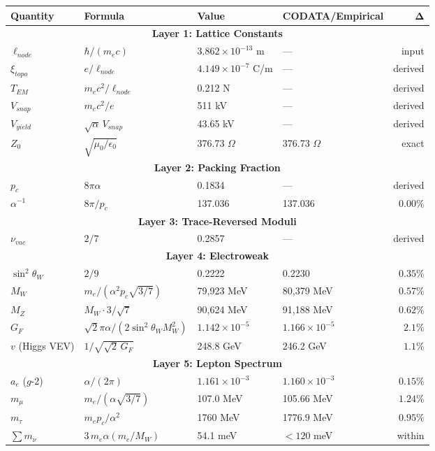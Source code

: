 \begin{center}
\small
\renewcommand{\arraystretch}{1.3}
\begin{tabular}{@{}llllr@{}}
\toprule
\textbf{Quantity} & \textbf{Formula} & \textbf{Value}
& \textbf{CODATA/Empirical} & $\boldsymbol{\Delta}$ \\
\midrule
\multicolumn{5}{c}{\cellcolor[HTML]{EFEFEF}\textbf{Layer 1: Lattice Constants}}\\
$\ell_{node}$ & $\hbar/(m_e c)$ & $3.862\!\times\!10^{-13}$ m & --- & input \\
$\xi_{topo}$  & $e/\ell_{node}$ & $4.149\!\times\!10^{-7}$ C/m & --- & derived \\
$T_{EM}$      & $m_e c^2/\ell_{node}$ & 0.212 N & --- & derived \\
$V_{snap}$    & $m_e c^2/e$ & 511 kV & --- & derived \\
$V_{yield}$   & $\sqrt{\alpha}\,V_{snap}$ & 43.65 kV & --- & derived \\
$Z_0$         & $\sqrt{\mu_0/\epsilon_0}$ & 376.73 $\Omega$ & 376.73 $\Omega$ & exact \\

\multicolumn{5}{c}{\cellcolor[HTML]{EFEFEF}\textbf{Layer 2: Packing Fraction}}\\
$p_c$         & $8\pi\alpha$ & 0.1834 & --- & derived \\
$\alpha^{-1}$ & $8\pi/p_c$ & 137.036 & 137.036 & $0.00\%$ \\

\multicolumn{5}{c}{\cellcolor[HTML]{EFEFEF}\textbf{Layer 3: Trace-Reversed Moduli}}\\
$\nu_{vac}$   & $2/7$ & 0.2857 & --- & derived \\

\multicolumn{5}{c}{\cellcolor[HTML]{EFEFEF}\textbf{Layer 4: Electroweak}}\\
$\sin^2\theta_W$ & $2/9$ & 0.2222 & 0.2230 & $0.35\%$ \\
$M_W$         & $m_e/(\alpha^2 p_c\sqrt{3/7})$ & 79,923 MeV & 80,379 MeV & $0.57\%$ \\
$M_Z$         & $M_W \cdot 3/\sqrt{7}$ & 90,624 MeV & 91,188 MeV & $0.62\%$ \\
$G_F$         & $\sqrt{2}\pi\alpha/(2\sin^2\!\theta_W M_W^2)$ & $1.142\!\times\!10^{-5}$ & $1.166\!\times\!10^{-5}$ & $2.1\%$ \\
$v$ (Higgs VEV) & $1/\sqrt{\sqrt{2}\,G_F}$ & 248.8 GeV & 246.2 GeV & $1.1\%$ \\

\multicolumn{5}{c}{\cellcolor[HTML]{EFEFEF}\textbf{Layer 5: Lepton Spectrum}}\\
$a_e$ ($g$-2)  & $\alpha/(2\pi)$ & $1.161\!\times\!10^{-3}$ & $1.160\!\times\!10^{-3}$ & $0.15\%$ \\
$m_\mu$       & $m_e/(\alpha\sqrt{3/7})$ & 107.0 MeV & 105.66 MeV & $1.24\%$ \\
$m_\tau$      & $m_e p_c/\alpha^2$ & 1760 MeV & 1776.9 MeV & $0.95\%$ \\
$\sum m_\nu$  & $3\,m_e\alpha(m_e/M_W)$ & 54.1 meV & $<120$ meV & within \\


\end{tabular}
\end{center}
